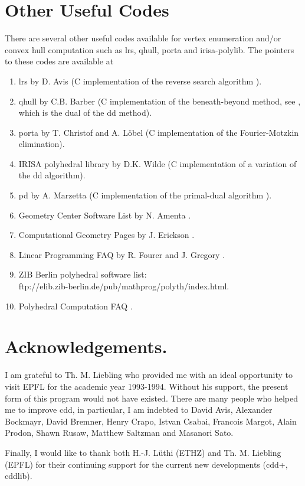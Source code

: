 \documentclass[11pt]{article}
\newcommand {\0} {{\bf 0}}
\begin{document}
\section{Other Useful Codes}  \label{CODES}
There are several other useful codes available for vertex enumeration and/or
convex hull computation  such as lrs, qhull, porta and irisa-polylib.
The pointers to these codes are available at
\begin{enumerate}
\item lrs by D. Avis \cite{a-uglrs-97} (C implementation of the reverse search algorithm 
\cite{af-pachv-92}). 

\item qhull by C.B. Barber \cite{bdh-qach-95} (C implementation of
the beneath-beyond method, see \cite{e-acg-87,m-cg-94},
which is the dual of the dd method). 

\item porta by T. Christof and A. L{\"o}bel \cite{cl-porta-97} (C implementation
of the Fourier-Motzkin elimination).

\item IRISA polyhedral library by D.K. Wilde
\cite{w-ldpo-93b} (C implementation
of a variation of the dd algorithm).

\item pd by A. Marzetta \cite{m-pdcip-97} (C implementation of the primal-dual algorithm 
\cite{bfm-pdmvf-97}). 

 \item Geometry Center Software List by N. Amenta \cite{a-dcg}.

 \item Computational Geometry Pages by J. Erickson \cite{e-cgp}.

 \item Linear Programming FAQ by R. Fourer and J. Gregory \cite{fg-lpfaq-97}.

 \item ZIB Berlin polyhedral software list:\\
{ftp://elib.zib-berlin.de/pub/mathprog/polyth/index.html}.

\item Polyhedral Computation FAQ \cite{f-pcfaq-98}.
\end{enumerate}


\section*{Acknowledgements.} 
I am  grateful to Th. M. Liebling who
provided me with an ideal opportunity to visit EPFL
for the academic year 1993-1994.  Without his 
support, the present form of this program would not have existed.
There are many people who helped me to improve cdd, in particular,
I am indebted to David Avis, 
Alexander Bockmayr, David Bremner, 
Henry Crapo, Istvan Csabai, 
Francois Margot,
Alain Prodon, 
Shawn Rusaw, Matthew Saltzman 
and Masanori Sato. 

Finally, I would like to thank both H.-J. L\"uthi (ETHZ)
 and Th. M. Liebling (EPFL) for their continuing support for 
the current new developments (cdd+, cddlib).  




\end{document}

